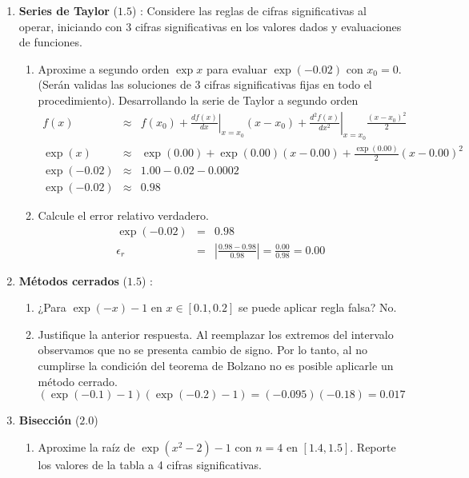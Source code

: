 \documentclass[12pt]{article}
\begin{document}
  \begin{enumerate}[leftmargin=*,widest=9]
    \item \textbf{Series de Taylor} ($1.5$) : Considere las reglas de cifras significativas al operar, iniciando con 3 cifras significativas en los valores dados y evaluaciones de funciones.
    \begin{enumerate}[label=\alph*]
    \item Aproxime a segundo orden $\exp x$ para evaluar $\exp (-0.02)$ con $x_0 = 0$. (Serán validas las soluciones de 3 cifras significativas fijas en todo el procedimiento).
    Desarrollando la serie de Taylor a segundo orden
    \begin{eqnarray*}
    f(x) & \approx & f(x_0) + \left.\frac{df(x)}{dx}\right|_{x=x_0}(x-x_0)+ \left.\frac{d^2f(x)}{dx^2}\right|_{x=x_0}\frac{(x-x_0)^2}{2}\\
    \exp(x) & \approx & \exp(0.00) + \exp(0.00)(x-0.00) + \frac{\exp(0.00)}{2}(x-0.00)^2 \\
    \exp(-0.02) & \approx & 1.00 - 0.02 - 0.0002\\
    \exp(-0.02) & \approx & 0.98
    \end{eqnarray*}
   \item Calcule el error relativo verdadero.
    \begin{eqnarray*}
    \exp(-0.02) & = & 0.98\\
    \epsilon_r & = & \left| \frac{0.98 - 0.98}{0.98} \right| = \frac{0.00}{0.98} = 0.00
    \end{eqnarray*}
    \end{enumerate}
    \item \textbf{Métodos cerrados} ($1.5$) :
    \begin{enumerate}[label=\alph*]
    \item ¿Para $\exp (-x) - 1$ en $x \in \left[ 0.1, 0.2 \right]$ se puede aplicar regla falsa?
    No.
    \item Justifique la anterior respuesta.
   Al reemplazar los extremos del intervalo observamos que no se presenta cambio de signo. Por lo tanto, al no cumplirse la condición del teorema de Bolzano no es posible aplicarle un método cerrado.
   \[ (\exp(-0.1)-1)(\exp(-0.2)-1) = (-0.095)(-0.18) = 0.017 \]
    \end{enumerate}
    \item \textbf{Bisección} ($2.0$)
    \begin{enumerate}[label=\alph*]
    \item Aproxime la raíz de $\exp (x^2 - 2) - 1$ con $n=4$ en $\left[1.4, 1.5\right]$. Reporte los valores de la tabla a 4 cifras significativas.

\end{enumerate}
\end{enumerate}
\end{document}
